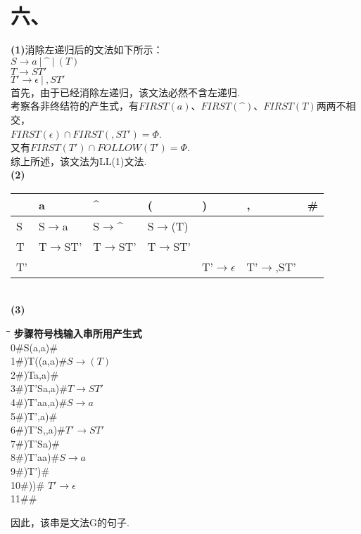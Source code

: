 \documentclass{article}
\begin{document}
\section*{六、}
\noindent
\textbf{(1)}消除左递归后的文法如下所示：\\
$S\rightarrow a\ |\ \^{}\ |\ (T)$\\
$T\rightarrow ST'$\\
$T'\rightarrow \epsilon\ |\ ,ST'$\\
首先，由于已经消除左递归，该文法必然不含左递归.\\
考察各非终结符的产生式，有$FIRST(a)$、$FIRST(\^{})$、$FIRST(T)$两两不相交，\\
$FIRST(\epsilon)\cap FIRST(,ST')=\Phi$.\\
又有$FIRST(T')\cap FOLLOW(T')=\Phi$.\\
综上所述，该文法为LL(1)文法.\\
\textbf{(2)}
\begin{table}[h]
    \centering
\begin{tabular}{|p{2cm}<{\centering}|p{2cm}<{\centering}|p{2cm}<{\centering}|p{2cm}<{\centering}|p{2cm}<{\centering}|p{2cm}<{\centering}|p{2cm}<{\centering}|}   
    \hline
    \ & a & $\^{}$ & ( & ) & , & \# \\
    \hline
    S & S$\rightarrow$a & S$\rightarrow\^{}$ & S$\rightarrow$(T) & \ & \ & \ \\
    \hline
    T & T$\rightarrow$ST' & T$\rightarrow$ST' & T$\rightarrow$ST' & & & \\
    \hline
    T' & & & & T'$\rightarrow\epsilon$& T'$\rightarrow$,ST' & \\
    \hline
\end{tabular}
\end{table}
\\
\textbf{(3)}
\begin{tabbing}
    \hspace{1.5cm} \= \hspace{3cm}\= \hspace{3cm}\= \hspace{3cm}\= \kill
    \textbf{步骤}\>\textbf{符号栈}\>\textbf{输入串}\>\textbf{所用产生式}\\
    0\>\#S\>(a,a)\#\\
    1\>\#)T(\>(a,a)\#\>$S\rightarrow(T)$\\
    2\>\#)T\>a,a)\#\\
    3\>\#)T'S\>a,a)\#\>$T\rightarrow ST'$\\
    4\>\#)T'a\>a,a)\#\>$S\rightarrow a$\\
    5\>\#)T'\>,a)\#\\
    6\>\#)T'S,\>,a)\#\>$T'\rightarrow ST'$\\
    7\>\#)T'S\>a)\#\\
    8\>\#)T'a\>a)\#\>$S\rightarrow a$\\
    9\>\#)T'\>)\#\\
    10\>\#)\>)\#\> $T'\rightarrow\epsilon$\\
    11\>\#\>\#
\end{tabbing}
因此，该串是文法G的句子.
\end{document}

